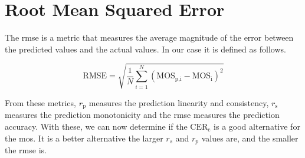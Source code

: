 \section{Root Mean Squared Error}
\label{sec:rmse}

The \gls{rmse} is a metric that measures the average magnitude of the error between the predicted values and the actual values.
In our case it is defined as follows.

\begin{equation}
    \text{RMSE} = \sqrt{\frac{1}{N}\sum_{i=1}^{N}{(\text{MOS}_{\text{p,i}} - \text{MOS}_{\text{i}})^2}}
    \label{eq:rmse}
\end{equation}

From these metrics, $r_{\text{p}}$ measures the prediction linearity and consistency, $r_{\text{s}}$ measures the prediction monotonicity and the \gls{rmse} measures the prediction accuracy.
With these, we can now determine if the $\text{CER}_{\text{c}}$ is a good alternative for the \gls{mos}.
It is a better alternative the larger $r_s$ and $r_p$ values are, and the smaller the \gls{rmse} is.
